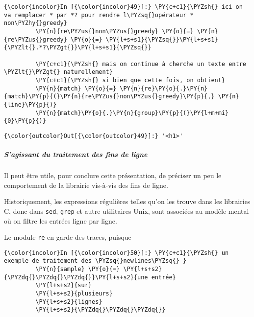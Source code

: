     \begin{Verbatim}[commandchars=\\\{\},frame=single,framerule=0.3mm,rulecolor=\color{cellframecolor}]
{\color{incolor}In [{\color{incolor}49}]:} \PY{c+c1}{\PYZsh{} ici on va remplacer * par *? pour rendre l\PYZsq{}opérateur * non\PYZhy{}greedy}
         \PY{n}{re\PYZus{}non\PYZus{}greedy} \PY{o}{=} \PY{n}{re\PYZus{}greedy} \PY{o}{=} \PY{l+s+s1}{\PYZsq{}}\PY{l+s+s1}{\PYZlt{}.*?\PYZgt{}}\PY{l+s+s1}{\PYZsq{}}
         
         \PY{c+c1}{\PYZsh{} mais on continue à cherche un texte entre \PYZlt{}\PYZgt{} naturellement}
         \PY{c+c1}{\PYZsh{} si bien que cette fois, on obtient}
         \PY{n}{match} \PY{o}{=} \PY{n}{re}\PY{o}{.}\PY{n}{match}\PY{p}{(}\PY{n}{re\PYZus{}non\PYZus{}greedy}\PY{p}{,} \PY{n}{line}\PY{p}{)}
         \PY{n}{match}\PY{o}{.}\PY{n}{group}\PY{p}{(}\PY{l+m+mi}{0}\PY{p}{)}
\end{Verbatim}


\begin{Verbatim}[commandchars=\\\{\},frame=single,framerule=0.3mm,rulecolor=\color{cellframecolor}]
{\color{outcolor}Out[{\color{outcolor}49}]:} '<h1>'
\end{Verbatim}
            
    \hypertarget{sagissant-du-traitement-des-fins-de-ligne}{%
\subparagraph{S'agissant du traitement des fins de
ligne}\label{sagissant-du-traitement-des-fins-de-ligne}}

    Il peut être utile, pour conclure cette présentation, de préciser un peu
le comportement de la librairie vis-à-vis des fins de ligne.

Historiquement, les expressions régulières telles qu'on les trouve dans
les librairies C, donc dans \texttt{sed}, \texttt{grep} et autre
utilitaires Unix, sont associées au modèle mental où on filtre les
entrées ligne par ligne.

Le module \texttt{re} en garde des traces, puisque

    \begin{Verbatim}[commandchars=\\\{\},frame=single,framerule=0.3mm,rulecolor=\color{cellframecolor}]
{\color{incolor}In [{\color{incolor}50}]:} \PY{c+c1}{\PYZsh{} un exemple de traitement des \PYZsq{}newlines\PYZsq{} }
         \PY{n}{sample} \PY{o}{=} \PY{l+s+s2}{\PYZdq{}\PYZdq{}\PYZdq{}}\PY{l+s+s2}{une entrée}
         \PY{l+s+s2}{sur}
         \PY{l+s+s2}{plusieurs}
         \PY{l+s+s2}{lignes}
         \PY{l+s+s2}{\PYZdq{}\PYZdq{}\PYZdq{}}
\end{Verbatim}


